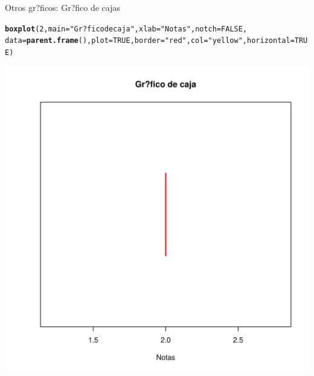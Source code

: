 \documentclass[10pt,a4paper]{article}\usepackage[]{graphicx}\usepackage[]{color}
\makeatletter
\def\maxwidth{ %
  \ifdim\Gin@nat@width>\linewidth
    \linewidth
  \else
    \Gin@nat@width
  \fi
}
\newcommand{\hlnum}[1]{\textcolor[rgb]{0.686,0.059,0.569}{#1}}%
\newcommand{\hlstr}[1]{\textcolor[rgb]{0.192,0.494,0.8}{#1}}%
\newcommand{\hlstd}[1]{\textcolor[rgb]{0.345,0.345,0.345}{#1}}%
\newcommand{\hlkwc}[1]{\textcolor[rgb]{0.333,0.667,0.333}{#1}}%
\newcommand{\hlkwd}[1]{\textcolor[rgb]{0.737,0.353,0.396}{\textbf{#1}}}%
\newenvironment{kframe}{%
 \def\at@end@of@kframe{}%
 \ifinner\ifhmode%
  \def\at@end@of@kframe{\end{minipage}}%
  \begin{minipage}{\columnwidth}%
 \fi\fi%
 \def\FrameCommand##1{\hskip\@totalleftmargin \hskip-\fboxsep
 \colorbox{shadecolor}{##1}\hskip-\fboxsep
     \hskip-\linewidth \hskip-\@totalleftmargin \hskip\columnwidth}%
 \MakeFramed {\advance\hsize-\width
   \@totalleftmargin\z@ \linewidth\hsize
   \@setminipage}}%
 {\par\unskip\endMakeFramed%
 \at@end@of@kframe}
\newenvironment{knitrout}{}{} %
\makeatother
\begin{document}
Otros gr?ficos: 
Gr?fico de cajas 
\begin{knitrout}
\color{fgcolor}\begin{kframe}
\begin{alltt}
\hlkwd{boxplot}\hlstd{(}\hlnum{2}\hlstd{,} \hlkwc{main}\hlstd{=}\hlstr{"Gr?fico de caja"}\hlstd{,} \hlkwc{xlab}\hlstd{=}\hlstr{"Notas"}\hlstd{,} \hlkwc{notch}\hlstd{=}\hlnum{FALSE}\hlstd{,}
\hlkwc{data}\hlstd{=}\hlkwd{parent.frame}\hlstd{(),} \hlkwc{plot}\hlstd{=}\hlnum{TRUE}\hlstd{,} \hlkwc{border}\hlstd{=}\hlstr{"red"}\hlstd{,} \hlkwc{col}\hlstd{=}\hlstr{"yellow"}\hlstd{,}\hlkwc{horizontal}\hlstd{=}\hlnum{TRUE}\hlstd{)}
\end{alltt}
\end{kframe}
\includegraphics[width=\maxwidth]{figure/unnamed-chunk-19-1} 

\end{knitrout}
\end{document}
